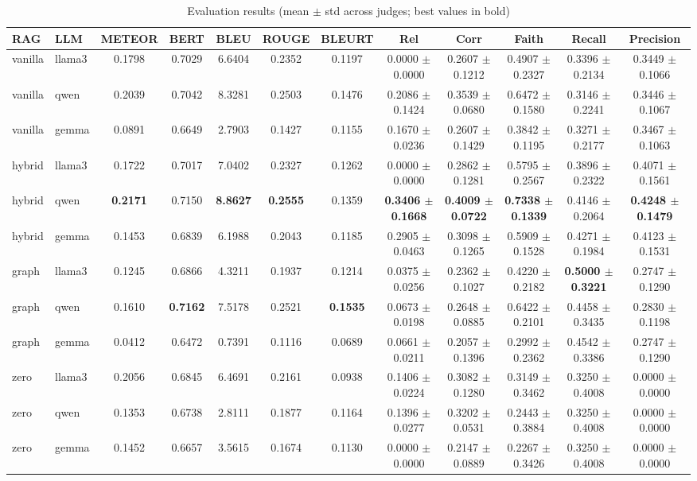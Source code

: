 
\begin{table}[ht]
\centering
\scriptsize
\begin{tabular}{llccccc|ccccc}
\toprule
RAG & LLM
& METEOR & BERT & BLEU & ROUGE & BLEURT
& Rel & Corr & Faith & Recall & Precision \\
\midrule

vanilla & llama3 & 0.1798 & 0.7029 & 6.6404 & 0.2352 & 0.1197 & 0.0000 $\pm$ 0.0000 & 0.2607 $\pm$ 0.1212 & 0.4907 $\pm$ 0.2327 & 0.3396 $\pm$ 0.2134 & 0.3449 $\pm$ 0.1066 \\
vanilla & qwen & 0.2039 & 0.7042 & 8.3281 & 0.2503 & 0.1476 & 0.2086 $\pm$ 0.1424 & 0.3539 $\pm$ 0.0680 & 0.6472 $\pm$ 0.1580 & 0.3146 $\pm$ 0.2241 & 0.3446 $\pm$ 0.1067 \\
vanilla & gemma & 0.0891 & 0.6649 & 2.7903 & 0.1427 & 0.1155 & 0.1670 $\pm$ 0.0236 & 0.2607 $\pm$ 0.1429 & 0.3842 $\pm$ 0.1195 & 0.3271 $\pm$ 0.2177 & 0.3467 $\pm$ 0.1063 \\
hybrid & llama3 & 0.1722 & 0.7017 & 7.0402 & 0.2327 & 0.1262 & 0.0000 $\pm$ 0.0000 & 0.2862 $\pm$ 0.1281 & 0.5795 $\pm$ 0.2567 & 0.3896 $\pm$ 0.2322 & 0.4071 $\pm$ 0.1561 \\
hybrid & qwen & \textbf{0.2171} & 0.7150 & \textbf{8.8627} & \textbf{0.2555} & 0.1359 & \textbf{0.3406 $\pm$ 0.1668} & \textbf{0.4009 $\pm$ 0.0722} & \textbf{0.7338 $\pm$ 0.1339} & 0.4146 $\pm$ 0.2064 & \textbf{0.4248 $\pm$ 0.1479} \\
hybrid & gemma & 0.1453 & 0.6839 & 6.1988 & 0.2043 & 0.1185 & 0.2905 $\pm$ 0.0463 & 0.3098 $\pm$ 0.1265 & 0.5909 $\pm$ 0.1528 & 0.4271 $\pm$ 0.1984 & 0.4123 $\pm$ 0.1531 \\
graph & llama3 & 0.1245 & 0.6866 & 4.3211 & 0.1937 & 0.1214 & 0.0375 $\pm$ 0.0256 & 0.2362 $\pm$ 0.1027 & 0.4220 $\pm$ 0.2182 & \textbf{0.5000 $\pm$ 0.3221} & 0.2747 $\pm$ 0.1290 \\
graph & qwen & 0.1610 & \textbf{0.7162} & 7.5178 & 0.2521 & \textbf{0.1535} & 0.0673 $\pm$ 0.0198 & 0.2648 $\pm$ 0.0885 & 0.6422 $\pm$ 0.2101 & 0.4458 $\pm$ 0.3435 & 0.2830 $\pm$ 0.1198 \\
graph & gemma & 0.0412 & 0.6472 & 0.7391 & 0.1116 & 0.0689 & 0.0661 $\pm$ 0.0211 & 0.2057 $\pm$ 0.1396 & 0.2992 $\pm$ 0.2362 & 0.4542 $\pm$ 0.3386 & 0.2747 $\pm$ 0.1290 \\
zero & llama3 & 0.2056 & 0.6845 & 6.4691 & 0.2161 & 0.0938 & 0.1406 $\pm$ 0.0224 & 0.3082 $\pm$ 0.1280 & 0.3149 $\pm$ 0.3462 & 0.3250 $\pm$ 0.4008 & 0.0000 $\pm$ 0.0000 \\
zero & qwen & 0.1353 & 0.6738 & 2.8111 & 0.1877 & 0.1164 & 0.1396 $\pm$ 0.0277 & 0.3202 $\pm$ 0.0531 & 0.2443 $\pm$ 0.3884 & 0.3250 $\pm$ 0.4008 & 0.0000 $\pm$ 0.0000 \\
zero & gemma & 0.1452 & 0.6657 & 3.5615 & 0.1674 & 0.1130 & 0.0000 $\pm$ 0.0000 & 0.2147 $\pm$ 0.0889 & 0.2267 $\pm$ 0.3426 & 0.3250 $\pm$ 0.4008 & 0.0000 $\pm$ 0.0000 \\

\bottomrule
\end{tabular}
\caption{Evaluation results (mean $\pm$ std across judges; best values in bold)}
\label{tab:full_results}
\end{table}
